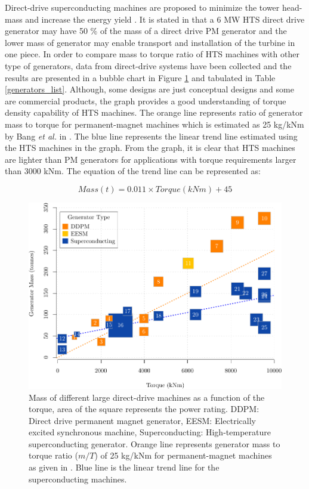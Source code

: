 \documentclass[12pt]{iopart}
\begin{document}
Direct-drive superconducting machines are proposed to minimize the tower head-mass and increase the energy yield \cite{Lesser2009, Lewis2007, Kalsi2004a}. It is stated in \cite{Lewis2007} that a 6 MW HTS direct drive generator may have 50 \% of the mass of a direct drive PM generator and the lower mass of generator may enable transport and installation of the turbine in one piece.
In order to compare mass to torque ratio of HTS machines with other type of generators, data from direct-drive systems have been collected and the results are presented in a bubble chart in Figure \ref{generators_mass_comparison} and tabulated in Table \ref{generators_list}. Although, some designs are just conceptual designs and some are commercial products, the graph provides a good understanding of torque density capability of HTS machines.  The orange line represents ratio of generator mass to torque for permanent-magnet machines which is estimated as 25 kg/kNm by Bang \textit{et al.} in \cite{Bang2008}. The blue line represents the linear trend line estimated using the HTS machines in the graph. From the graph, it is clear that HTS machines are lighter than PM generators for applications with torque requirements larger than 3000 kNm. The equation of the trend line can be represented as:

 \begin{equation}
     Mass(t)=0.011\times Torque(kNm)+45
     \label{mass_torque_eq}
 \end{equation}

\begin{figure}[]
\centering
\includegraphics[]{generator_mass_compare}
\caption{Mass of different large direct-drive machines as a function of the torque, area of the square represents the power rating.
 DDPM: Direct drive permanent magnet generator, EESM: Electrically excited synchronous machine, Superconducting: High-temperature superconducting generator. Orange line represents generator mass to torque ratio ($m/T$) of 25 kg/kNm for permanent-magnet machines as given in \cite{Bang2008}. Blue line is the linear trend line for the superconducting machines.}
\label{generators_mass_comparison}
\end{figure}
\end{document}
